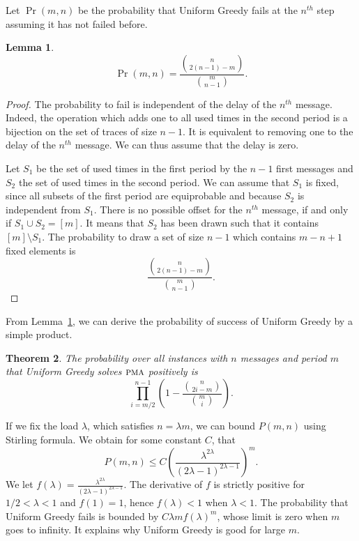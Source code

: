 \documentclass[10pt, conference, letterpaper]{IEEEtran}
\newtheorem{theorem}{Theorem}
\newtheorem{lemma}[theorem]{Lemma}
\newcommand\pma{\textsc{pma}\xspace}
\begin{document}
Let $\Pr(m,n)$ be the probability that Uniform Greedy fails at the $n^{th}$
step assuming it has not failed before.

\begin{lemma}\label{lemma:proba_fail}
$$\Pr(m,n) = \frac{\binom{n}{2(n-1)-m}}{\binom{m}{n-1}}.$$
\end{lemma}
\begin{proof}
The probability to fail is independent of the delay of the $n^{th}$
message. Indeed,  the operation which adds one to all used times
in the second period  is a bijection on the set of traces of size $n-1$. It is equivalent to removing one to the delay of the $n^{th}$ message. We can thus assume that the delay is zero.

Let $S_1$ be the set of used times in the first period by the $n-1$ first messages
and $S_2$ the set of used times in the second period. We can assume that $S_1$ is fixed, since all subsets of the first period are equiprobable and because $S_2$ is independent from $S_1$. There is no possible offset for the $n^{th}$ message, if and only if $S_1 \cup S_2 = [m]$. It means that $S_2$ has been drawn such that it contains $[m] \setminus S_1$. 
The probability to draw a set of size $n-1$ which contains $m-n + 1$ fixed elements is 
 $$\frac{\binom{n}{2(n-1)-m}}{\binom{m}{n-1}}.$$
\end{proof}

From Lemma~\ref{lemma:proba_fail}, we can derive the probability 
of success of Uniform Greedy by a simple product. 

\begin{theorem}\label{theorem:uniform}
The probability over all instances with $n$ messages and period $m$ that Uniform Greedy solves $\pma$ positively is $$\displaystyle{\prod_{i=m/2}^{n-1}(1 - \frac{\binom{n}{2i-m}}{\binom{m}{i}})}.$$
\end{theorem}

If we fix the load $\lambda$, which satisfies $n = \lambda m$, we can bound 
$P(m,n)$ using Stirling formula. We obtain for some constant $C$, 
that $$P(m,n) \leq C \left(\frac{\lambda^{2\lambda}}{(2\lambda -1)^{2\lambda -1}}\right)^m.$$
We let $f(\lambda) = \frac{\lambda^{2\lambda}}{(2\lambda -1)^{2\lambda -1}}$.
The derivative of $f$ is strictly positive for $1/2 < \lambda < 1$ and $f(1) = 1$, hence 
$f(\lambda) < 1$ when $\lambda < 1$. The probability that Uniform Greedy fails is bounded 
by $C \lambda m f(\lambda)^m$, whose limit is zero when $m$ goes to infinity. 
It explains why Uniform Greedy is good for large $m$. 
\end{document}
